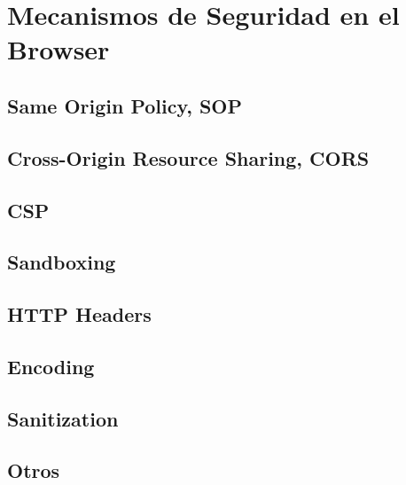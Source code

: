 \section{Mecanismos de Seguridad en el Browser}
\label{sec:chap2.3}


\subsection{Same Origin Policy, SOP}
\label{sec:chap2.3.1}


\subsection{Cross-Origin Resource Sharing, CORS}
\label{sec:chap2.3.2}


\subsection{CSP}
\label{sec:chap2.3.3}


\subsection{Sandboxing}
\label{sec:chap2.3.4}


\subsection{HTTP Headers}
\label{sec:chap2.3.5}


\subsection{Encoding}
\label{sec:chap2.3.6}


\subsection{Sanitization}
\label{sec:chap2.3.7}


\subsection{Otros}
\label{sec:chap2.3.8}




%
